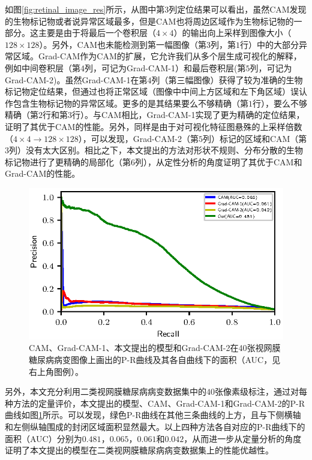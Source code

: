 \noindent 如图\ref{fig:retinal_image_res}所示，从图中第$3$列定位结果可以看出，虽然CAM发现的生物标记物或者说异常区域最多，但是CAM也将周边区域作为生物标记物的一部分。这主要是由于将最后一个卷积层（$4\times 4$）的输出向上采样到图像大小（$128\times 128$）。另外，CAM也未能检测到第一幅图像（第$3$列，第$1$行）中的大部分异常区域。Grad-CAM作为CAM的扩展，它允许我们从多个层生成可视化的解释，例如中间卷积层（第$4$列，可记为Grad-CAM-1）和最后卷积层(第$5$列，可记为Grad-CAM-2)。虽然Grad-CAM-1在第$4$列（第三幅图像）获得了较为准确的生物标记物定位结果，但通过也将正常区域（图像中中间上方区域和左下角区域）误认作包含生物标记物的异常区域。更多的是其结果要么不够精确（第$1$行），要么不够精确（第$2$行和第$3$行）。与CAM相比，Grad-CAM-1实现了更为精确的定位结果，证明了其优于CAM的性能。另外，同样是由于对可视化特征图悬殊的上采样倍数（$4\times 4 \rightarrow 128\times 128$），可以发现，Grad-CAM-2（第$5$列）标记的区域和CAM（第$3$列）没有太大区别。相比之下，本文提出的方法对形状不规则、分布分散的生物标记物进行了更精确的局部化（第$6$列），从定性分析的角度证明了其优于CAM和Grad-CAM的性能。

\begin{figure}[h]
	\centering
	\includegraphics[width=1.0\textwidth]{figure/pr_curve_retinal_image/pr_curve.eps}
	\caption{CAM、Grad-CAM-1、本文提出的模型和Grad-CAM-2在40张视网膜糖尿病病变图像上画出的P-R曲线及其各自曲线下的面积（AUC，见右上角图例）。} 
	\label{fig:retinal_image_pr_curve}
\end{figure}

另外，本文充分利用二类视网膜糖尿病病变数据集中的$40$张像素级标注，通过对每种方法的定量评价，本文提出的模型、CAM、Grad-CAM-1和Grad-CAM-2的P-R曲线如图\ref{fig:retinal_image_pr_curve}所示。可以发现，绿色P-R曲线在其他三条曲线的上方，且与下侧横轴和左侧纵轴围成的封闭区域面积显然最大。以上四种方法各自对应的P-R曲线下的面积（AUC）分别为$0.481$，$0.065$，$0.061$和$0.042$，从而进一步从定量分析的角度证明了本文提出的模型在二类视网膜糖尿病病变数据集上的性能优越性。

